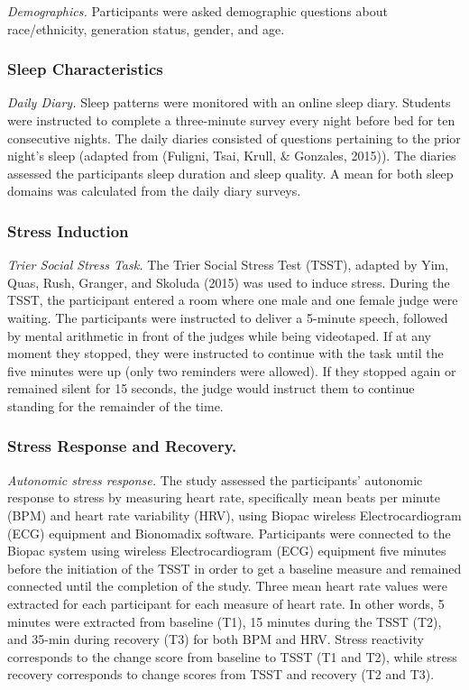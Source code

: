 \documentclass[
  man, fleqn, noextraspace]{apa6}
\begin{document}
\emph{Demographics.} Participants were asked demographic questions about race/ethnicity, generation status, gender, and age.

\hypertarget{sleep-characteristics}{%
\subsubsection{Sleep Characteristics}\label{sleep-characteristics}}

\emph{Daily Diary.} Sleep patterns were monitored with an online sleep diary. Students were instructed to complete a three-minute survey every night before bed for ten consecutive nights. The daily diaries consisted of questions pertaining to the prior night's sleep (adapted from (Fuligni, Tsai, Krull, \& Gonzales, 2015)). The diaries assessed the participants sleep duration and sleep quality. A mean for both sleep domains was calculated from the daily diary surveys.

\hypertarget{stress-induction}{%
\subsubsection{Stress Induction}\label{stress-induction}}

\emph{Trier Social Stress Task.} The Trier Social Stress Test (TSST), adapted by Yim, Quas, Rush, Granger, and Skoluda (2015) was used to induce stress. During the TSST, the participant entered a room where one male and one female judge were waiting. The participants were instructed to deliver a 5-minute speech, followed by mental arithmetic in front of the judges while being videotaped. If at any moment they stopped, they were instructed to continue with the task until the five minutes were up (only two reminders were allowed). If they stopped again or remained silent for 15 seconds, the judge would instruct them to continue standing for the remainder of the time.

\hypertarget{stress-response-and-recovery.}{%
\subsubsection{Stress Response and Recovery.}\label{stress-response-and-recovery.}}

\emph{Autonomic stress response.} The study assessed the participants' autonomic response to stress by measuring heart rate, specifically mean beats per minute (BPM) and heart rate variability (HRV), using Biopac wireless Electrocardiogram (ECG) equipment and Bionomadix software. Participants were connected to the Biopac system using wireless Electrocardiogram (ECG) equipment five minutes before the initiation of the TSST in order to get a baseline measure and remained connected until the completion of the study. Three mean heart rate values were extracted for each participant for each measure of heart rate. In other words, 5 minutes were extracted from baseline (T1), 15 minutes during the TSST (T2), and 35-min during recovery (T3) for both BPM and HRV. Stress reactivity corresponds to the change score from baseline to TSST (T1 and T2), while stress recovery corresponds to change scores from TSST and recovery (T2 and T3).
\end{document}
